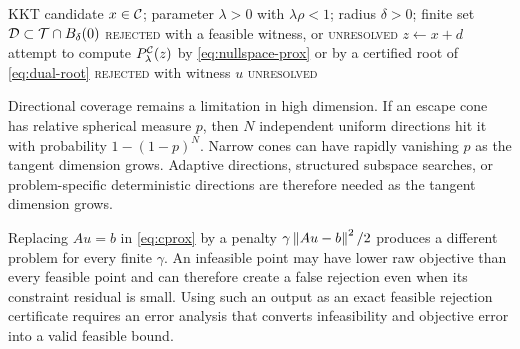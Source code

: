 \begin{algorithm}[htbp]
  \caption{Finite proximal-escape search with certified rejection}
  \label{alg:safe-finite-escape}
  \begin{algorithmic}[1]
    \Require KKT candidate \(x\in\mathcal{C}\); parameter
      \(\lambda>0\) with \(\lambda\rho<1\); radius \(\delta>0\); finite set
      \(\mathcal D\subset\mathcal{T}\cap B_\delta(0)\)
    \Ensure \textsc{rejected} with a feasible witness, or
      \textsc{unresolved}
      \State \(z\gets x+d\)
      \State attempt to compute \(P_\lambda^{\mathcal{C}}(z)\) by
        \cref{eq:nullspace-prox} or by a certified root of
        \cref{eq:dual-root}
        \State \Return \textsc{rejected} with witness \(u\)
      \EndIf
    \EndFor
    \State \Return \textsc{unresolved}
  \end{algorithmic}
\end{algorithm}
\FloatBarrier

Directional coverage remains a limitation in high dimension.  If an escape
cone has relative spherical measure \(p\), then \(N\) independent uniform
directions hit it with probability \(1-(1-p)^N\).  Narrow cones can have
rapidly vanishing \(p\) as the tangent dimension grows.  Adaptive directions,
structured subspace searches, or problem-specific deterministic directions
are therefore needed as the tangent dimension grows.

Replacing \(Au=b\) in \cref{eq:cprox} by a penalty
\(\gamma\left\lVert Au-b\right\rVert^2/2\) produces a different problem for every finite
\(\gamma\).  An infeasible point may have lower raw objective than every
feasible point and can therefore create a false rejection even when its
constraint residual is small.  Using such an output as an exact feasible
rejection certificate requires an error analysis that converts infeasibility
and objective error into a valid feasible bound.
